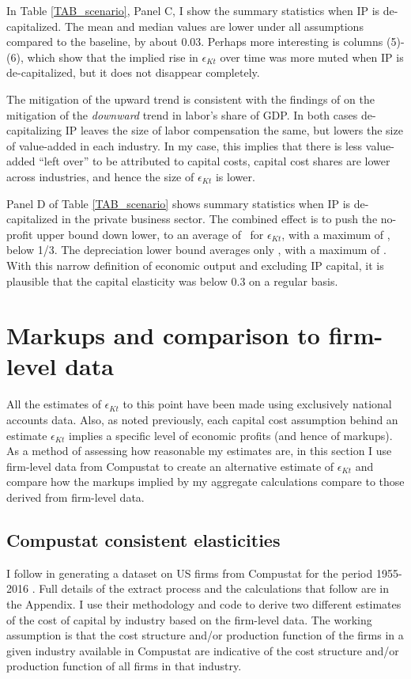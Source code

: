 \documentclass[11pt]{article}
\begin{document}
In Table \ref{TAB_scenario}, Panel C, I show the summary statistics when IP is de-capitalized. The mean and median values are lower under all assumptions compared to the baseline, by about 0.03. Perhaps more interesting is columns (5)-(6), which show that the implied rise in $\epsilon_{Kt}$ over time was more muted when IP is de-capitalized, but it does not disappear completely. 

The mitigation of the upward trend is consistent with the findings of \cite{ksz2020} on the mitigation of the \textit{downward} trend in labor's share of GDP. In both cases de-capitalizing IP leaves the size of labor compensation the same, but lowers the size of value-added in each industry. In my case, this implies that there is less value-added ``left over'' to be attributed to capital costs, capital cost shares are lower across industries, and hence the size of $\epsilon_{Kt}$ is lower. 

Panel D of Table \ref{TAB_scenario} shows summary statistics when IP is de-capitalized in the private business sector. The combined effect is to push the no-profit upper bound down lower, to an average of \exclnoprofit \ for $\epsilon_{Kt}$, with a maximum of \exclmaxnoprofit, below 1/3. The depreciation lower bound averages only \excldepr, with a maximum of \exclmaxdepr. With this narrow definition of economic output and excluding IP capital, it is plausible that the capital elasticity was below 0.3 on a regular basis.

\section{Markups and comparison to firm-level data}\label{SEC_compustat}
All the estimates of $\epsilon_{Kt}$ to this point have been made using exclusively national accounts data. Also, as noted previously, each capital cost assumption behind an estimate $\epsilon_{Kt}$ implies a specific level of economic profits (and hence of markups). As a method of assessing how reasonable my estimates are, in this section I use firm-level data from Compustat to create an alternative estimate of $\epsilon_{Kt}$ and compare how the markups implied by my aggregate calculations compare to those derived from firm-level data.

\subsection{Compustat consistent elasticities}
I follow \cite{dleu2020} in generating a dataset on US firms from Compustat for the period 1955-2016 \citep{dleudata2020}. Full details of the extract process and the calculations that follow are in the Appendix. I use their methodology and code to derive two different estimates of the cost of capital by industry based on the firm-level data. The working assumption is that the cost structure and/or production function of the firms in a given industry available in Compustat are indicative of the cost structure and/or production function of all firms in that industry. 
\end{document}
